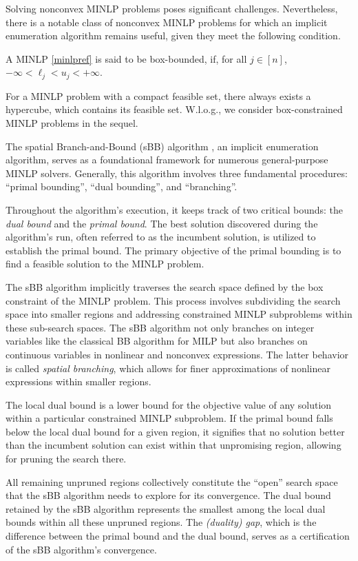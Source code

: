 Solving nonconvex MINLP problems poses significant challenges. Nevertheless, there is a notable class of nonconvex MINLP problems for which an implicit enumeration algorithm remains useful, given they meet the following condition.

\begin{definition}
    A MINLP \eqref{minlpref} is said to be box-bounded, if, for all $j \in [n]$, $-\infty < \ell_j < u_j <+\infty$. 
\end{definition}

For a MINLP problem with a compact feasible set, there always exists a hypercube, which contains its feasible set. W.l.o.g., we consider box-constrained MINLP problems in the sequel. 

 The spatial Branch-and-Bound (sBB) algorithm \cite{leonelson}, an implicit enumeration algorithm, serves as a foundational framework for numerous general-purpose MINLP solvers. Generally, this algorithm involves three fundamental procedures: ``primal bounding'', ``dual bounding'', and ``branching''.



Throughout the algorithm's execution, it keeps track of two critical bounds: the \emph{dual bound} and the \emph{primal bound}. The best solution discovered during the algorithm's run, often referred to as the incumbent solution, is utilized to establish the primal bound. The primary objective of the primal bounding is to find a feasible solution to the MINLP problem.

The sBB algorithm implicitly traverses the search space defined by the box constraint of the MINLP problem. This process involves subdividing the search space into smaller regions and addressing constrained MINLP subproblems within these sub-search spaces. The sBB algorithm not only branches on integer variables like the classical BB algorithm for MILP but also branches on continuous variables in nonlinear and nonconvex expressions. The latter behavior is called \emph{spatial branching}, which allows for finer approximations of nonlinear expressions within smaller regions.

The local dual bound is  a lower bound for the objective value of any solution within a particular constrained MINLP subproblem. If the primal bound falls below the local dual bound for a given region, it signifies that no solution better than the incumbent solution can exist within that unpromising region, allowing for pruning the search there.


All remaining unpruned regions collectively constitute the ``open'' search space that the sBB algorithm needs to explore for its convergence. The dual bound retained by the sBB algorithm represents the smallest among the local dual bounds within all these unpruned regions. The \emph{(duality) gap}, which is the difference between the primal bound and the dual bound, serves as a certification of the sBB algorithm's convergence.

